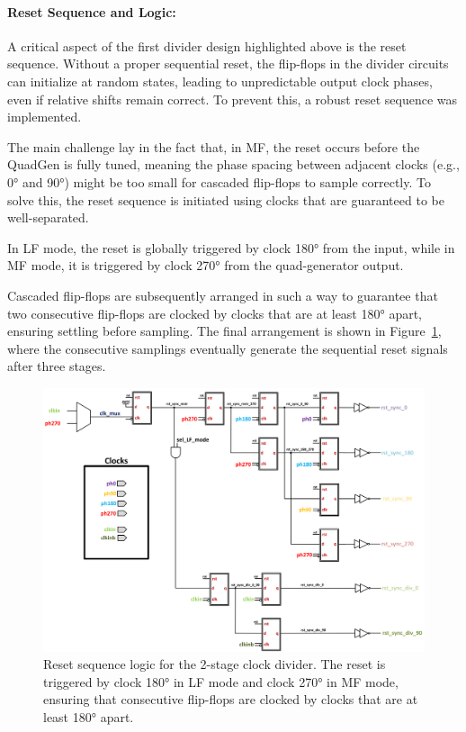 \paragraph{Reset Sequence and Logic:}

A critical aspect of the first divider design highlighted above is the reset sequence. Without a proper sequential reset, the flip-flops in the divider circuits can initialize at random states, leading to unpredictable output clock phases, even if relative shifts remain correct. To prevent this, a robust reset sequence was implemented.

The main challenge lay in the fact that, in MF, the reset occurs before the QuadGen is fully tuned, meaning the phase spacing between adjacent clocks (e.g., \ang{0} and \ang{90}) might be too small for cascaded flip-flops to sample correctly. To solve this, the reset sequence is initiated using clocks that are guaranteed to be well-separated. 

In LF mode, the reset is globally triggered by clock \ang{180} from the input, while in MF mode, it is triggered by clock \ang{270} from the quad-generator output. 

Cascaded flip-flops are subsequently arranged in such a way to guarantee that two consecutive flip-flops are clocked by clocks that are at least \ang{180} apart, ensuring settling before sampling. The final arrangement is shown in Figure~\ref{fig:reset_seq}, where the consecutive samplings eventually generate the sequential reset signals after three stages.

\begin{figure}[H]
  \centering
  \includegraphics[width=\linewidth]{figures/Schematics/reset_seq.png}
  \caption{Reset sequence logic for the 2-stage clock divider. The reset is triggered by clock \ang{180} in LF mode and clock \ang{270} in MF mode, ensuring that consecutive flip-flops are clocked by clocks that are at least \ang{180} apart.}
  \label{fig:reset_seq}
\end{figure}


